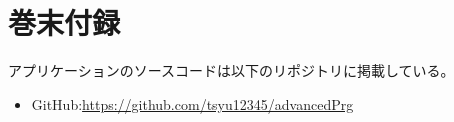 \documentclass[dvipdfmx, titlepage]{jsarticle}
\begin{document}
\section{巻末付録}
アプリケーションのソースコードは以下のリポジトリに掲載している。
\begin{itemize}
  \item GitHub:\url{https://github.com/tsyu12345/advancedPrg}
\end{itemize}
\end{document}
